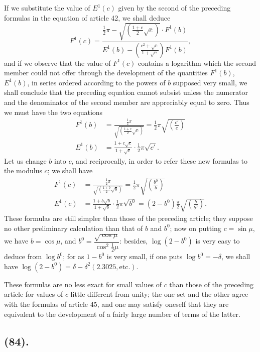 \documentclass{article}
\begin{document}
If we substitute the value of $E^{1}(c)$ given by the second of the preceding formulas in the equation of article 42, we shall deduce
\[ F^{1}(c)=\frac{\tfrac{1}{2}\pi-\sqrt{\left(\frac{1+c}{2}\sqrt{c}\right)}\cdot F^{1}(b)}{E^{1}(b)-\left(\frac{c^{2}+\sqrt{c}}{1+\sqrt{c}}\right)F^{1}(b)}, \]
and if we observe that the value of $F^{1}(c)$ contains a logarithm which the second member could not offer through the development of the quantities $F^{1}(b)$, $E^{1}(b)$, in series ordered according to the powers of $b$ supposed very small, we shall conclude that the preceding equation cannot subsist unless the numerator and the denominator of the second member are appreciably equal to zero. Thus we must have the two equations
\[ \begin{aligned} F^{1}(b)&=\frac{\tfrac{1}{2}\pi}{\sqrt{\left(\frac{1+c}{2}\sqrt{c}\right)}}=\tfrac{1}{2}\pi\sqrt{\left(\frac{c'}{c}\right)}\\ E^{1}(b)&=\frac{1+c\sqrt{c}}{1+\sqrt{c}}\cdot\tfrac{1}{2}\pi\sqrt{c'}. \end{aligned} \]
Let us change $b$ into $c$, and reciprocally, in order to refer these new formulas to the modulus $c$; we shall have
\[ \begin{aligned} F^{1}(c)&=\frac{\tfrac{1}{2}\pi}{\sqrt{\left(\frac{1+b}{2}\sqrt{b}\right)}}=\tfrac{1}{2}\pi\sqrt{\left(\frac{b^{0}}{b}\right)}\\ E^{1}(c)&=\frac{1+b\sqrt{b}}{1+\sqrt{b}}\cdot\tfrac{1}{2}\pi\sqrt{b^{0}}=(2-b^{0})\frac{\pi}{2}\sqrt{\left(\frac{b}{b^{0}}\right)}. \end{aligned} \]
These formulas are still simpler than those of the preceding article; they suppose no other preliminary calculation than that of $b$ and $b^{0}$; now on putting $c=\sin\mu$, we have $b=\cos\mu$, and $b^{0}=\dfrac{\sqrt{\cos\mu}}{\cos^{2}\frac{1}{2}\mu}$: besides, $\log(2-b^{0})$ is very easy to deduce from $\log b^{0}$; for as $1-b^{0}$ is very small, if one puts $\log b^{0}=-\delta$, we shall have $\log(2-b^{0})=\delta-\delta^{2}(2.3025,\text{etc.})$.

These formulas are no less exact for small values of $c$ than those of the preceding article for values of $c$ little different from unity; the one set and the other agree with the formulas of article 45, and one may satisfy oneself that they are equivalent to the development of a fairly large number of terms of the latter.

\subsection*{(84).}
\end{document}
